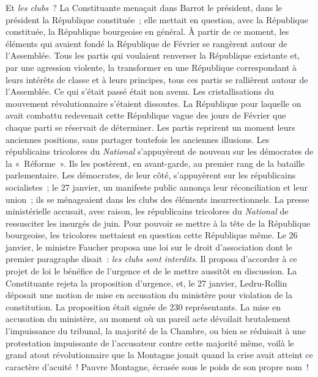 \documentclass[french,twoside]{book} %
\begin{document}
Et \emph{les clubs} ? La Constituante menaçait dans Barrot le président, dans le président la République constituée ; elle mettait en question, avec la République constituée, la République bourgeoise en général. À partir de ce moment, les éléments qui avaient fondé la République de Février se rangèrent autour de l’Assemblée. Tous les partis qui voulaient renverser la République existante et, par une agression violente, la transformer en une République correspondant à leurs intérêts de classe et à leurs principes, tous ces partis se rallièrent autour de l’Assemblée. Ce qui s’était passé était non avenu. Les cristallisations du mouvement révolutionnaire s’étaient dissoutes. La République pour laquelle on avait combattu redevenait cette République vague des jours de Février que chaque parti se réservait de déterminer. Les partis reprirent un moment leurs anciennes positions, sans partager toutefois les anciennes illusions. Les républicains tricolores du \emph{National} s’appuyèrent de nouveau sur les démocrates de la « Réforme ». Ils les postèrent, en avant-garde, au premier rang de la bataille parlementaire. Les démocrates, de leur côté, s’appuyèrent sur les républicains socialistes ; le 27 janvier, un manifeste public annonça leur réconciliation et leur union ; ils se ménageaient dans les clubs des éléments insurrectionnels. La presse ministérielle accusait, avec raison, les républicains tricolores du \emph{National} de ressusciter les insurgés de juin. Pour pouvoir se mettre à la tête de la République bourgeoise, les tricolores mettaient en question cette République même. Le 26 janvier, le ministre Faucher proposa une loi sur le droit d’association dont le premier paragraphe disait : \emph{les clubs sont interdits}. Il proposa d’accorder à ce projet de loi le bénéfice de l’urgence et de le mettre aussitôt en discussion. La Constituante rejeta la proposition d’urgence, et, le 27 janvier, Ledru-Rollin déposait une motion de mise en accusation du ministère pour violation de la constitution. La proposition était signée de 230 représentants. La mise en accusation du ministère, au moment où un pareil acte dévoilait brutalement l’impuissance du tribunal, la majorité de la Chambre, ou bien se réduisait à une protestation impuissante de l’accusateur contre cette majorité même, voilà le grand atout révolutionnaire que la Montagne jouait quand la crise avait atteint ce caractère d’acuité ! Pauvre Montagne, écrasée sous le poids de son propre nom !\par
\end{document}
